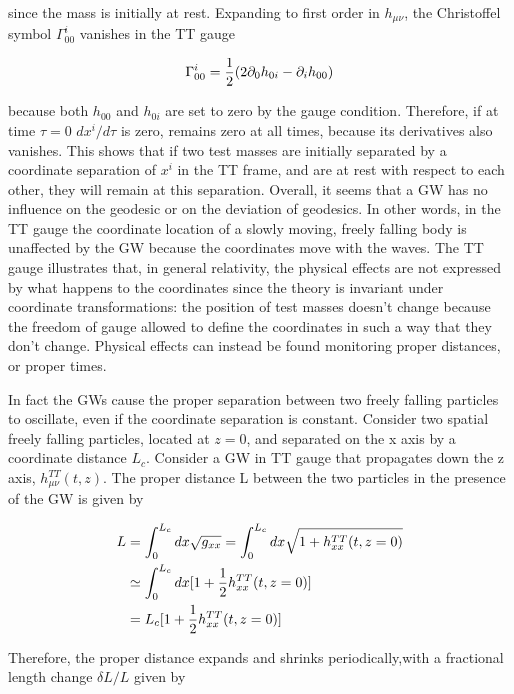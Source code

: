 \documentclass[binding=0.6cm, LaM]{sapthesis}
\begin{document}
	since the mass is initially at rest. Expanding to first order in $h_{\mu\nu}$, 
	the Christoffel symbol $\Gamma^i_{00}$ vanishes in the TT gauge

		\begin{equation}
		\Gamma^i_{00} = {1 \over {2}}(2\partial_{0}h_{0i} - \partial_i h_{00})
		\end{equation}

	because both $h_{00}$ and $h_{0i}$ are set to zero by the gauge condition. 
	Therefore, if at time $\tau = 0$ $dx^i/d\tau$ is zero, remains zero at all times, 
	because its derivatives also vanishes.
	This shows that if two test masses are initially separated by a coordinate separation of $x^i$ in the TT frame, 
	and are at rest with respect to each other, they will remain at this separation.
	Overall, it seems that a GW has no influence on the geodesic or on the deviation of geodesics.
	In other words, in the TT gauge the coordinate location of a slowly moving, freely falling body is unaffected 
	by the GW because the coordinates move with the waves.
	The TT gauge illustrates that, in general relativity, the physical effects are not expressed by what happens 
	to the coordinates since the theory is invariant under coordinate transformations:
	the position of test masses doesn't change because the freedom of gauge allowed to define the coordinates 
	in such a way that they don't change.
	Physical effects can instead be found monitoring proper distances, or proper times.

	In fact the GWs cause the proper separation between two freely falling particles to oscillate, 
	even if the coordinate separation is constant. Consider two spatial freely falling particles, 
	located at $z = 0$, and separated on the x axis by a coordinate distance $L_c$. 
	Consider a GW in TT gauge that propagates down the z axis, $h^{TT}_{\mu\nu}(t,z)$. 
	The proper distance L between the two particles in the presence of the GW is given by

		\begin{align}
		L & = \int^{L_c}_{0}{dx\sqrt{g_{xx}}} = \int^{L_c}_{0}dx\sqrt{1 + h^{TT}_{xx}(t,z=0)} \\
		& \simeq \int^{L_c}_{0}{dx[1 + {1 \over 2}h^{TT}_{xx}(t,z=0)]} \\
		&= L_c[1 + {1 \over 2}h^{TT}_{xx}(t,z=0)]
		\end{align}

	Therefore, the proper distance expands and shrinks periodically,with a fractional length change $\delta L/L$ given by
\end{document}
